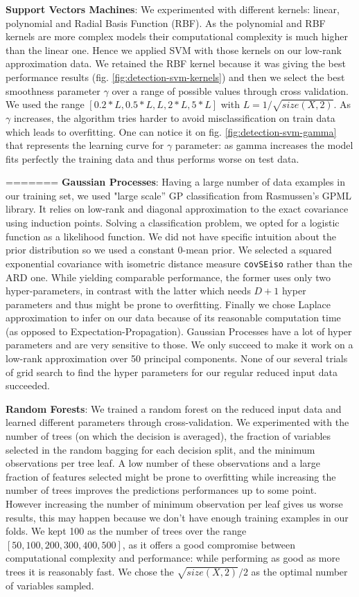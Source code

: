 \documentclass{article}
\begin{document}
  \textbf{Support Vectors Machines}: We experimented with different kernels: linear, polynomial and Radial Basis Function (RBF). As the polynomial and RBF kernels are more complex models their computational complexity is much higher than the linear one. Hence we applied SVM with those kernels on our low-rank approximation data. We retained the RBF kernel because it was giving the best performance results (fig. \ref{fig:detection-svm-kernels}) and then we select the best smoothness parameter $\gamma$ over a range of possible values through cross validation. We used the range $[0.2*L, 0.5*L, L, 2*L, 5*L]$ with $L = 1 / \sqrt{size(X,2)}$. As $\gamma$ increases, the algorithm tries harder to avoid misclassification on train data which leads to overfitting. One can notice it on fig. \ref{fig:detection-svm-gamma} that represents the learning curve for $\gamma$ parameter: as gamma increases the model fits perfectly the training data and thus performs worse on test data.
  
=======
  \textbf{Gaussian Processes}: Having a large number of data examples in our training set, we used "large scale'' GP classification from Rasmussen's GPML library. It relies on low-rank and diagonal approximation to the exact covariance using induction points. Solving a classification problem, we opted for a logistic function as a likelihood function. We did not have specific intuition about the prior distribution so we used a constant 0-mean prior. We selected a squared exponential covariance with isometric distance measure \texttt{covSEiso} rather than the ARD one. While yielding comparable performance, the former uses only two hyper-parameters, in contrast with the latter which needs $D+1$ hyper parameters and thus might be prone to overfitting. Finally we chose Laplace approximation to infer on our data because of its reasonable computation time (as opposed to Expectation-Propagation). Gaussian Processes have a lot of hyper parameters and are very sensitive to those. We only succeed to make it work on a low-rank approximation over 50 principal components. None of our several trials of grid search to find the hyper parameters for our regular reduced input data succeeded.

    \textbf{Random Forests}: We trained a random forest on the reduced input data and learned different parameters through cross-validation. We experimented with the number of trees (on which the decision is averaged), the fraction of variables selected in the random bagging for each decision split, and the minimum observations per tree leaf. A low number of these observations and a large fraction of features selected might be prone to overfitting while increasing the number of trees improves the predictions performances up to some point. However increasing the number of minimum observation per leaf gives us worse results, this may happen because we don't have enough training examples in our folds. We kept 100 as the number of trees over the range $[50, 100, 200, 300, 400, 500]$, as it offers a good compromise between computational complexity and performance:  while performing as good as more trees it is reasonably fast. We chose the $\sqrt{size(X,2)}/ 2$ as the optimal number of variables sampled.
\end{document}
